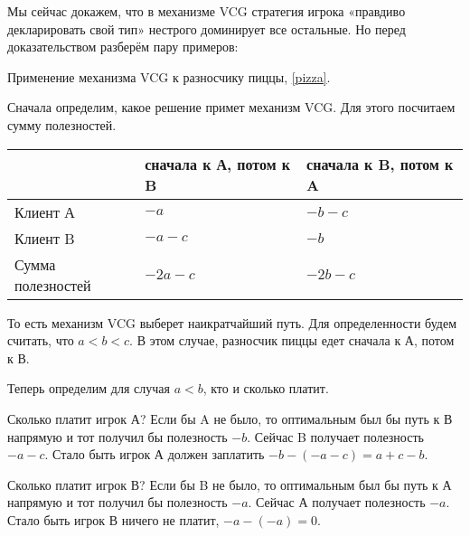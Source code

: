 Мы сейчас докажем, что в механизме VCG стратегия игрока «правдиво декларировать свой тип» нестрого доминирует все остальные. Но перед доказательством разберём пару примеров:

\begin{myex}
Применение механизма VCG к разносчику пиццы, \ref{pizza}.

Сначала определим, какое решение примет механизм VCG. Для этого посчитаем сумму полезностей.

\begin{tabular}{p{3 cm}|p{3 cm}p{3 cm}}
& сначала к А, потом к B & сначала к B, потом к A \\
\hline
Клиент А & $-a$ & $-b-c$ \\
Клиент B & $-a-c$ & $-b$ \\
Сумма полезностей& $-2a-c$ & $-2b-c$ \\
\end{tabular}

То есть механизм VCG выберет наикратчайший путь. Для определенности будем считать, что $ a<b<c $. В этом случае, разносчик пиццы едет сначала к А, потом к В.

Теперь определим для случая $ a<b $, кто и сколько платит.

Сколько платит игрок А? Если бы A не было, то оптимальным был бы путь к В напрямую и тот получил бы полезность $ -b $. Сейчас B получает полезность $ -a-c $. Стало быть игрок А должен заплатить $ -b-(-a-c)=a+c-b $.

Сколько платит игрок В? Если бы B не было, то оптимальным был бы путь к А напрямую и тот получил бы полезность $ -a $. Сейчас А получает полезность $ -a $. Стало быть игрок В ничего не платит, $ -a-(-a)=0 $.
\end{myex}

